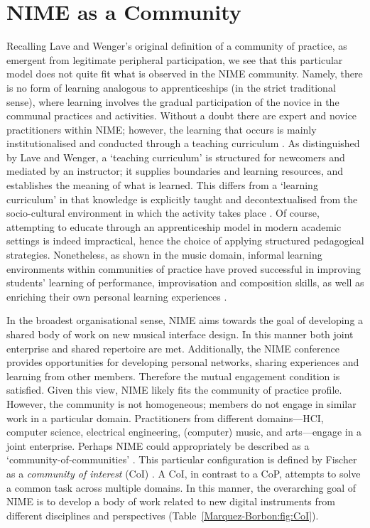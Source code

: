 \section{NIME as a Community}
Recalling Lave and Wenger's original definition of a community of practice, as emergent from legitimate peripheral participation, we see that this particular model does not quite fit what is observed in the NIME community. Namely, there is no form of learning analogous to apprenticeships (in the strict traditional sense), where learning involves the gradual participation of the novice in the communal practices and activities. Without a doubt there are expert and novice practitioners within NIME; however, the learning that occurs is mainly institutionalised and conducted through a teaching curriculum \cite{Fels:2009}. As distinguished by Lave and Wenger, a `teaching curriculum' is structured for newcomers and mediated by an instructor; it supplies boundaries and learning resources, and establishes the meaning of what is learned. This differs from a `learning curriculum' in that knowledge is explicitly taught and decontextualised from the socio-cultural environment in which the activity takes place \cite{Lave:1991}. Of course, attempting to educate through an apprenticeship model in modern academic settings is indeed impractical, hence the choice of applying structured pedagogical strategies. Nonetheless, as shown in the music domain, informal learning environments within communities of practice have proved successful in improving students' learning of performance, improvisation and composition skills, as well as enriching their own personal learning experiences \cite{MacMillan:2007,Waldron:2008,Waldron:2009}.

In the broadest organisational sense, NIME aims towards the goal of developing a shared body of work on new musical interface design. In this manner both joint enterprise and shared repertoire are met. Additionally, the NIME conference provides opportunities for developing personal networks, sharing experiences and learning from other members. Therefore the mutual engagement condition is satisfied. Given this view, NIME likely fits the community of practice profile. However, the community is not homogeneous; members do not engage in similar work in a particular domain. Practitioners from different domains---HCI, computer science, electrical engineering, (computer) music, and arts---engage in a joint enterprise. Perhaps NIME could appropriately be described as a `community-of-communities' \cite{Brown:1991}. This particular configuration is defined by Fischer as a \textit{community of interest} (CoI) \cite{Fischer:2009}. A CoI, in contrast to a CoP, attempts to solve a common task across multiple domains. In this manner, the overarching goal of NIME is to develop a body of work related to new digital instruments from different disciplines and perspectives (Table~\ref{Marquez-Borbon:fig:CoI}). 


